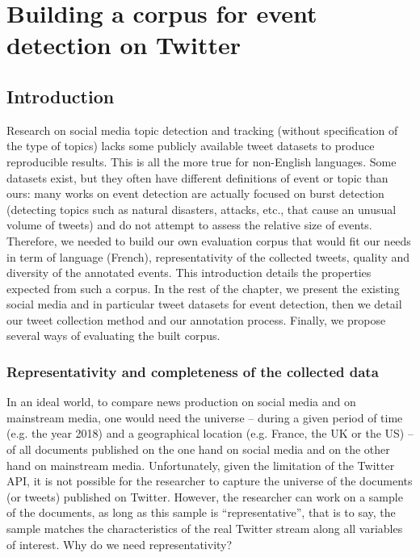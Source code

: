 \chapter{Building a corpus for event detection on Twitter}
\label{Chapter: Corpus}

\section{Introduction}

Research on social media topic detection and tracking (without specification
of the type of topics) lacks some publicly available tweet
datasets to produce reproducible results. This is all the
more true for non-English languages. Some datasets exist, but they often have different definitions of event or topic than ours: many works on event detection are actually focused on  burst detection (detecting topics such as natural disasters, attacks, etc., that cause an unusual volume of tweets) and do not attempt to assess the relative size of events. 
Therefore, we needed to build our own evaluation corpus that would fit our needs in term of language (French), representativity of the collected tweets, quality and diversity of the annotated events. This introduction details the properties expected from such a corpus. In the rest of the chapter, we present the existing social media and in particular tweet datasets for event detection, then we detail our tweet collection method and our annotation process. Finally, we propose several ways of evaluating the built corpus.

\subsection{Representativity and completeness of the collected data}
In an ideal world, to compare news production on social media and on mainstream media, one would need the
universe – during a given period of time (e.g. the year 2018) and a geographical location (e.g. France, the UK or
the US) – of all documents published on the one hand on social media and on the other hand on mainstream media.
Unfortunately, given the limitation of the Twitter API, it is not possible for the researcher to capture the universe
of the documents (or tweets) published on Twitter. However, the researcher can work on a sample of the documents,
as long as this sample is ``representative”, that is to say, the sample matches the characteristics of the real Twitter stream along all variables of interest.
Why do we need representativity?


